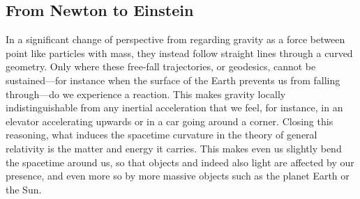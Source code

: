 \subsection{From Newton to Einstein}
 In
a significant change of perspective from regarding gravity as a force between point like
particles with mass, they instead follow straight lines through a curved geometry. Only
where these free-fall trajectories, or geodesics, cannot be sustained—for instance when the
surface of the Earth prevents us from falling through—do we experience a reaction. This
makes gravity locally indistinguishable from any inertial acceleration that we feel, for
instance, in an elevator accelerating upwards or in a car going around a corner. Closing
this reasoning, what induces the spacetime curvature in the theory of general relativity is
the matter and energy it carries. This makes even us slightly bend the spacetime around
us, so that objects and indeed also light are affected by our presence, and even more so
by more massive objects such as the planet Earth or the Sun.


